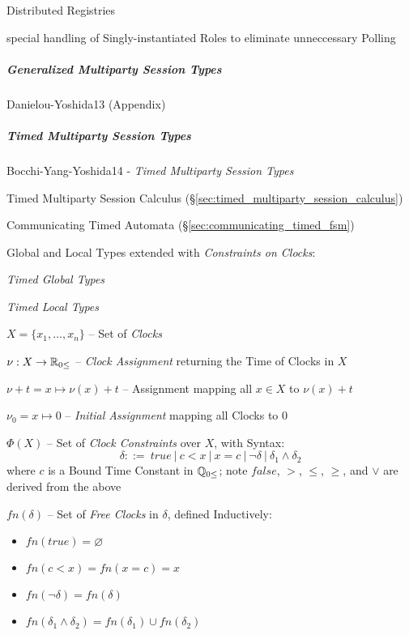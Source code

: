 Distributed Registries

special handling of Singly-instantiated Roles to eliminate
unneccessary Polling



\subparagraph{Generalized Multiparty Session Types}
\label{sec:generalized_multiparty}\hfill

Danielou-Yoshida13 (Appendix)



\subparagraph{Timed Multiparty Session Types}
\label{sec:timed_multiparty}\hfill

\begingroup

\newcommand{\bool}{\mathsf{bool}}
\newcommand{\nat}{\mathsf{nat}}
\newcommand{\enndd}{\mathsf{end}}

Bocchi-Yang-Yoshida14 - \emph{Timed Multiparty Session Types}

\fist Timed Multiparty Session Calculus
(\S\ref{sec:timed_multiparty_session_calculus})

Communicating Timed Automata (\S\ref{sec:communicating_timed_fsm})

Global and Local Types extended with \emph{Constraints on Clocks}:

\emph{Timed Global Types}

\emph{Timed Local Types}

$X = \{x_1, \ldots, x_n\}$ -- Set of \emph{Clocks}

$\nu : X \rightarrow \mathbb{R}_{0\leq}$ -- \emph{Clock Assignment}
returning the Time of Clocks in $X$

$\nu + t = x \mapsto \nu(x) + t$ -- Assignment mapping all $x \in X$
to $\nu(x) + t$

$\nu_0 = x \mapsto 0$ -- \emph{Initial Assignment} mapping all Clocks
to $0$

$\Phi(X)$ -- Set of \emph{Clock Constraints} over $X$, with Syntax:
\[
  \delta ::=\ true \ |\ c < x \ |\ x = c \ |
    \ \neg\delta \ |\ \delta_1 \wedge \delta_2
\]
where $c$ is a Bound Time Constant in $\mathbb{Q}_{0\leq}$; note $false$,
$>$, $\leq$, $\geq$, and $\vee$ are derived from the above

$fn(\delta)$ -- Set of \emph{Free Clocks} in $\delta$, defined
Inductively:
\begin{itemize}
  \item $fn (true) = \varnothing$
  \item $fn (c < x) = fn(x = c) = {x}$
  \item $fn (\neg\delta) = fn (\delta)$
  \item $fn (\delta_1 \wedge \delta_2)
    = fn (\delta_1) \cup fn (\delta_2)$
\end{itemize}

